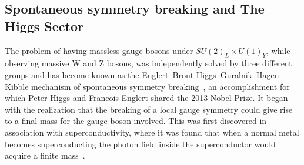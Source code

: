 \subsection{Spontaneous symmetry breaking and The Higgs Sector}
\label{sec:theory:higgs}
The problem of having massless gauge bosons under $SU(2)_L \times U(1)_Y$, while observing massive W and Z bosons, was independently solved by three different groups and has become known as the Englert–Brout-Higgs–Guralnik–Hagen–Kibble mechanism of spontaneous symmetry breaking~\cite{PhysRevLett.13.321,PhysRevLett.13.508,PhysRevLett.13.585}, an accomplishment for which Peter Higgs and Francois Englert shared the 2013 Nobel Prize.\newline
It began with the realization that the breaking of a local gauge symmetry could give rise to a final mass for the gauge boson involved. This was first discovered in association with superconductivity, where it was found that when a normal metal becomes superconducting the photon field inside the superconductor would acquire a finite mass~\cite{PhysRev.110.827}.

